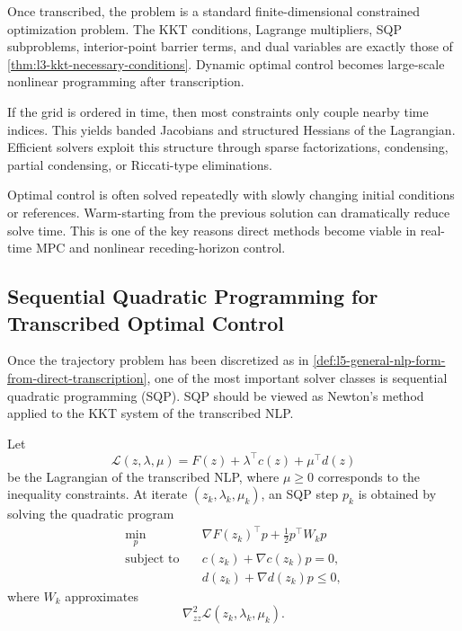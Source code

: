 \begin{remark}
	Once transcribed, the problem is a standard finite-dimensional constrained optimization problem. The KKT conditions, Lagrange multipliers, SQP subproblems, interior-point barrier terms, and dual variables are exactly those of \autoref{thm:l3-kkt-necessary-conditions}. Dynamic optimal control becomes large-scale nonlinear programming after transcription.
\end{remark}

\begin{remark}
	If the grid is ordered in time, then most constraints only couple nearby time indices. This yields banded Jacobians and structured Hessians of the Lagrangian. Efficient solvers exploit this structure through sparse factorizations, condensing, partial condensing, or Riccati-type eliminations.
\end{remark}

\begin{remark}
	Optimal control is often solved repeatedly with slowly changing initial conditions or references. Warm-starting from the previous solution can dramatically reduce solve time. This is one of the key reasons direct methods become viable in real-time MPC and nonlinear receding-horizon control.
\end{remark}

\subsection{Sequential Quadratic Programming for Transcribed Optimal Control}
\label{sec:l5-sequential-quadratic-programming-for-transcribed-optimal-control}

\begin{remark}
	Once the trajectory problem has been discretized as in \autoref{def:l5-general-nlp-form-from-direct-transcription}, one of the most important solver classes is sequential quadratic programming (SQP). SQP should be viewed as Newton's method applied to the KKT system of the transcribed NLP.
\end{remark}

\begin{definition}\label{def:l5-sqp-subproblem-for-trajectory-optimization}
	Let
	\[
		\mathcal{L}(z,\lambda,\mu)=F(z)+\lambda^\top c(z)+\mu^\top d(z)
	\]
	be the Lagrangian of the transcribed NLP, where $\mu \ge 0$ corresponds to the inequality constraints. At iterate $(z_k,\lambda_k,\mu_k)$, an SQP step $p_k$ is obtained by solving the quadratic program
	\begin{align*}
		\min_{p} \quad & \nabla F(z_k)^\top p + \frac{1}{2}p^\top W_k p \\
		\text{subject to}\quad & c(z_k)+\nabla c(z_k)p=0, \\
		                       & d(z_k)+\nabla d(z_k)p\le 0,
	\end{align*}
	where $W_k$ approximates
	\[
		\nabla_{zz}^2 \mathcal{L}(z_k,\lambda_k,\mu_k).
	\]
\end{definition}

